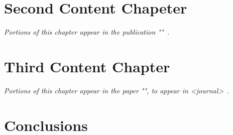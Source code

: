 \documentclass[tocnosub,noragright,centerchapter,fullpagesingle,12pt]{uiuc_csthesis18}
\begin{document}
\chapter{Second Content Chapeter}\label{chapter:content2}
\emph{Portions of this chapter appear in the publication ""~\cite{citation}.}
%

\chapter{Third Content Chapter} \label{subchapter:nap_spmv}
\emph{Portions of this chapter appear in the paper "", to appear in
<journal>~\cite{citation}.}
%

\chapter{Conclusions}
%

%
\appendix
%
\backmatter

%



\end{document}
